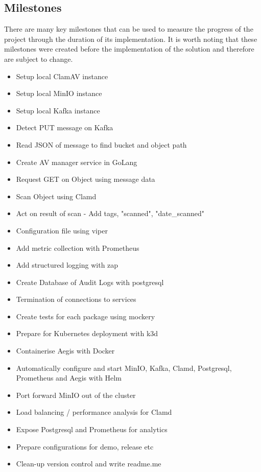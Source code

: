 \documentclass[12pt, conference, final, a4paper, onecolumn, compsoc]{IEEEtran}
\begin{document}
    \subsection*{Milestones} %

    There are many key milestones that can be used to measure the progress of
    the project through the duration of its implementation. It is worth noting
    that these milestones were created before the implementation of the solution
    and therefore are subject to change.

    \begin{itemize}
      \item Setup local ClamAV instance
      \item Setup local MinIO instance
      \item Setup local Kafka instance
      \item Detect PUT message on Kafka
      \item Read JSON of message to find bucket and object path
      \item Create AV manager service in GoLang
      \item Request GET on Object using message data
      \item Scan Object using Clamd
      \item Act on result of scan - Add tags, "scanned", "date\_scanned"
      \item Configuration file using viper
      \item Add metric collection with Prometheus
      \item Add structured logging with zap
      \item Create Database of Audit Logs with postgresql
      \item Termination of connections to services
      \item Create tests for each package using mockery

      \item Prepare for Kubernetes deployment with k3d
      \item Containerise Aegis with Docker
      \item Automatically configure and start MinIO, Kafka, Clamd, Postgresql,
      Prometheus and Aegis with Helm
      \item Port forward MinIO out of the cluster
      \item Load balancing / performance analysis for Clamd
      \item Expose Postgresql and Prometheus for analytics
      \item Prepare configurations for demo, release etc
      \item Clean-up version control and write readme.me
    \end{itemize}
\end{document}
